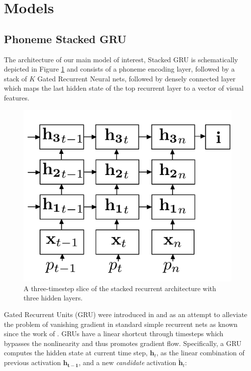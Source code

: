 \section{Models}
\label{sec:models}

\subsection{Phoneme Stacked GRU}
The architecture of our main model of interest, {\sc Stacked GRU} is
schematically depicted in Figure \ref{fig:architecture} and consists of a phoneme
encoding  layer, followed by a stack of $K$ Gated Recurrent Neural
nets, followed by densely connected layer which maps the last hidden
state of the top recurrent layer to a vector of visual features.

\begin{figure}
  \centering
  \includegraphics[scale=0.2]{architecture.pdf}
  \caption{A three-timestep slice of the stacked recurrent architecture with three hidden layers.}
  \label{fig:architecture}
\end{figure}

Gated Recurrent Units (GRU) were introduced in
 and  as an
attempt to alleviate the problem of vanishing gradient in standard
simple recurrent nets as known since the work of
. GRUs have a linear shortcut through
timesteps which bypasses the nonlinearity and thus promotes gradient
flow.
Specifically, a GRU computes the hidden state at current time step, $\mathbf{h}_{t}$, as the
linear combination of previous activation $\mathbf{h_{t-1}}$, and a new
{\it candidate} activation $\mathbf{\tilde{h}}_t$:
%

